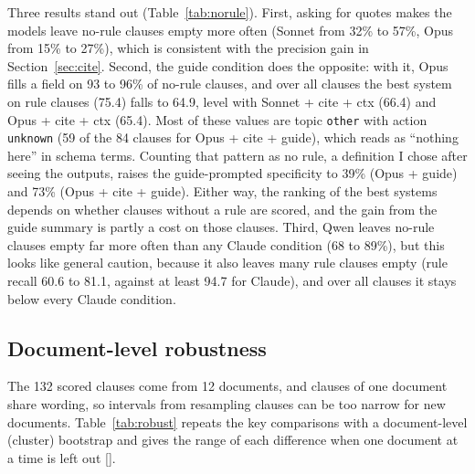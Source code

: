 \documentclass[11pt,a4paper]{article}
\newcommand{\res}[1]{{\small[\path{#1}]}}
\begin{document}
Three results stand out (Table~\ref{tab:norule}). First, asking for quotes makes the models leave no-rule clauses empty more often (Sonnet from 32\% to 57\%, Opus from 15\% to 27\%), which is consistent with the precision gain in Section~\ref{sec:cite}. Second, the guide condition does the opposite: with it, Opus fills a field on 93 to 96\% of no-rule clauses, and over all clauses the best system on rule clauses (75.4) falls to 64.9, level with Sonnet + cite + ctx (66.4) and Opus + cite + ctx (65.4). Most of these values are topic \texttt{other} with action \texttt{unknown} (59 of the 84 clauses for Opus + cite + guide), which reads as ``nothing here'' in schema terms. Counting that pattern as no rule, a definition I chose after seeing the outputs, raises the guide-prompted specificity to 39\% (Opus + guide) and 73\% (Opus + cite + guide). Either way, the ranking of the best systems depends on whether clauses without a rule are scored, and the gain from the guide summary is partly a cost on those clauses. Third, Qwen leaves no-rule clauses empty far more often than any Claude condition (68 to 89\%), but this looks like general caution, because it also leaves many rule clauses empty (rule recall 60.6 to 81.1, against at least 94.7 for Claude), and over all clauses it stays below every Claude condition.

\subsection{Document-level robustness}\label{sec:robust}

The 132 scored clauses come from 12 documents, and clauses of one document share wording, so intervals from resampling clauses can be too narrow for new documents. Table~\ref{tab:robust} repeats the key comparisons with a document-level (cluster) bootstrap and gives the range of each difference when one document at a time is left out \res{results/v1c_robustness.json}.
\end{document}
